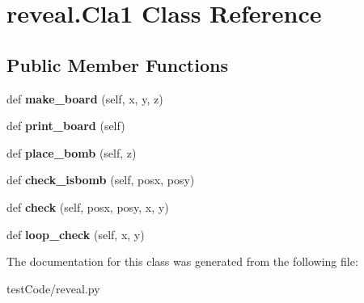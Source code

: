 \hypertarget{classreveal_1_1_cla1}{}\section{reveal.\+Cla1 Class Reference}
\label{classreveal_1_1_cla1}
\subsection*{Public Member Functions}
\begin{DoxyCompactItemize}
\item 
\mbox{\label{classreveal_1_1_cla1_af3b73e63924ed897e06bf4ab2d90b573}} 
def {\bfseries make\+\_\+board} (self, x, y, z)
\item 
\mbox{\label{classreveal_1_1_cla1_a2c14a5c0e6b8c0cc66931fb0b51b1858}} 
def {\bfseries print\+\_\+board} (self)
\item 
\mbox{\label{classreveal_1_1_cla1_aa3e5f37196a7cac9b75f68169a5ffabb}} 
def {\bfseries place\+\_\+bomb} (self, z)
\item 
\mbox{\label{classreveal_1_1_cla1_a41aa1e31df7e4421fe0ecac9a8471f98}} 
def {\bfseries check\+\_\+isbomb} (self, posx, posy)
\item 
\mbox{\label{classreveal_1_1_cla1_a3527258ba4eca9ff2224719a8bd40b0c}} 
def {\bfseries check} (self, posx, posy, x, y)
\item 
\mbox{\label{classreveal_1_1_cla1_a6024694230e7932be061a42e39df0de9}} 
def {\bfseries loop\+\_\+check} (self, x, y)
\end{DoxyCompactItemize}


The documentation for this class was generated from the following file\+:\begin{DoxyCompactItemize}
\item 
test\+Code/reveal.\+py\end{DoxyCompactItemize}
